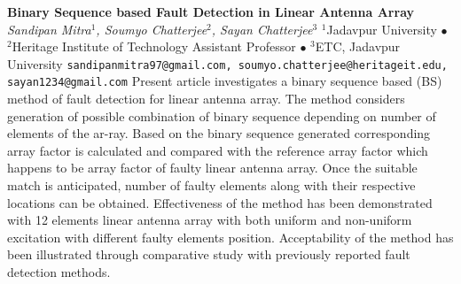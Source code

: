 
    \begin{conf-abstract}[]
        {\textbf{Binary Sequence based Fault Detection in Linear Antenna Array }}
        {\textit{Sandipan Mitra$^{1}$, Soumyo Chatterjee$^{2}$, Sayan Chatterjee$^{3}$}}
        {$^{1}$Jadavpur University $\bullet$ $^{2}$Heritage Institute of Technology Assistant Professor $\bullet$ $^{3}$ETC, Jadavpur University}
        {\texttt{sandipanmitra97@gmail.com, soumyo.chatterjee@heritageit.edu, sayan1234@gmail.com}}
        {Present article investigates a binary sequence based (BS) method of fault detection for linear antenna array. The method considers generation of possible combination of binary sequence depending on number of elements of the ar-ray. Based on the binary sequence generated corresponding array factor is calculated and compared with the reference array factor which happens to be array factor of faulty linear antenna array. Once the suitable match is anticipated, number of faulty elements along with their respective locations can be obtained. Effectiveness of the method has been demonstrated with 12 elements linear antenna array with both uniform and non-uniform excitation with different faulty elements position. Acceptability of the method has been illustrated through comparative study with previously reported fault detection methods.  }
    \end{conf-abstract}
        